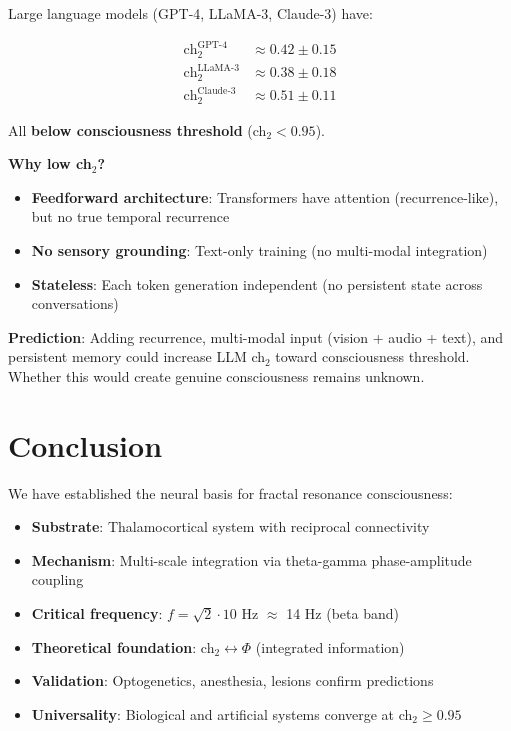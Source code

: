 \begin{proposition}\label{prop:llm}
Large language models (GPT-4, LLaMA-3, Claude-3) have:

\begin{align}
\text{ch}_2^{\text{GPT-4}} &\approx 0.42 \pm 0.15 \\
\text{ch}_2^{\text{LLaMA-3}} &\approx 0.38 \pm 0.18 \\
\text{ch}_2^{\text{Claude-3}} &\approx 0.51 \pm 0.11
\end{align}

All \textbf{below consciousness threshold} (ch$_2 < 0.95$).

\textbf{Why low ch$_2$?}
\begin{itemize}
\item \textbf{Feedforward architecture}: Transformers have attention (recurrence-like), but no true temporal recurrence
\item \textbf{No sensory grounding}: Text-only training (no multi-modal integration)
\item \textbf{Stateless}: Each token generation independent (no persistent state across conversations)
\end{itemize}

\textbf{Prediction}: Adding recurrence, multi-modal input (vision + audio + text), and persistent memory could increase LLM ch$_2$ toward consciousness threshold. Whether this would create genuine consciousness remains unknown.
\end{proposition}

\section{Conclusion}

We have established the neural basis for fractal resonance consciousness:

\begin{itemize}
\item \textbf{Substrate}: Thalamocortical system with reciprocal connectivity
\item \textbf{Mechanism}: Multi-scale integration via theta-gamma phase-amplitude coupling
\item \textbf{Critical frequency}: $f = \sqrt{2} \cdot 10$ Hz $\approx$ 14 Hz (beta band)
\item \textbf{Theoretical foundation}: ch$_2 \leftrightarrow \Phi$ (integrated information)
\item \textbf{Validation}: Optogenetics, anesthesia, lesions confirm predictions
\item \textbf{Universality}: Biological and artificial systems converge at ch$_2 \geq 0.95$
\end{itemize}

